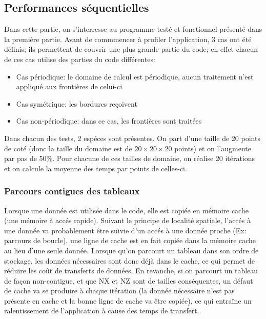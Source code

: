 \subsection{Performances séquentielles}
Dans cette partie, on s'interresse au programme testé et fonctionnel présenté dans la première partie. Avant de commmencer à profiler l'application, 3 cas ont été définis; ils permettent de couvrir une plus grande partie du code; en effet chacun de ces cas utilise des parties du code différentes:

\begin{itemize}
\item Cas périodique: le domaine de calcul est périodique, aucun traitement n'est appliqué aux frontières de celui-ci
\item Cas symétrique: les bordures reçoivent 
\item Cas non-périodique: dans ce cas, les frontières sont traitées
\end{itemize}


Dans chacun des tests, 2 espéces sont présentes. On part d'une taille de 20 points de coté (donc la taille du domaine est de $20\times20\times20$ points) et on l'augmente par pas de 50\%. Pour chacune de ces tailles de domaine, on réalise 20 itérations et on calcule la moyenne des temps par points de celles-ci.

\subsubsection{Parcours contigues des tableaux}
Lorsque une donnée est utilisée dans le code, elle est copiée en mémoire cache (une mémoire à accés rapide). Suivant le principe de localité spatiale, l'accés à une donnée va probablement être suivie d'un accés à une donnée proche (Ex: parcours de boucle), une ligne de cache est en fait copiée dans la mémoire cache au lieu d'une seule donnée. 
Lorsque qu'on parcourt un tableau dans son ordre de stockage, les données nécessaires sont donc déjà dans le cache, ce qui permet de réduire les coût de transferts de données. En revanche, si on parcourt un tableau de façon non-contigue, et que NX et NZ sont de tailles conséquentes, un défaut de cache va se produire à chaque itération (la donnée nécessaire n'est pas présente en cache et la bonne ligne de cache va être copiée), ce qui entraîne un ralentissement de l'application à cause des temps de transfert.

